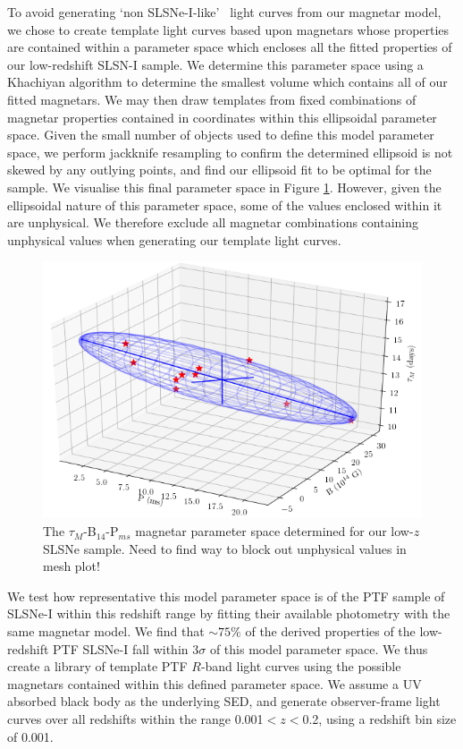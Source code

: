 \documentclass[a4paper,fleqn,usenatbib]{mnras}
\newcommand{\angus}[1]{\color{JungleGreen}#1\color{black}}
\begin{document}
To avoid generating \lq non SLSNe-I-like\rq~ light curves from our magnetar model, we chose to create template light curves based upon magnetars whose properties are contained within a parameter space which encloses all the fitted properties of our low-redshift SLSN-I sample. We determine this parameter space using a Khachiyan algorithm \citep{Aspvall1980,Khachiyan1980} to determine the smallest volume which contains all of our fitted magnetars. We may then draw templates from fixed combinations of magnetar properties contained in coordinates within this ellipsoidal parameter space. Given the small number of objects used to define this model parameter space, we perform jackknife resampling to confirm the determined ellipsoid is not skewed by any outlying points, and find our ellipsoid fit to be optimal for the sample. We visualise this final parameter space in Figure \ref{fig:param_space}. However, given the ellipsoidal nature of this parameter space, some of the values enclosed within it are unphysical. We therefore exclude all magnetar combinations containing unphysical values when generating our template light curves. 

\begin{figure}
	\includegraphics[width=\columnwidth]{./Original_3D_param_space.png}
    \caption{The $\tau_{M}$-B$_{14}$-P$_{ms}$ magnetar parameter space determined for our low-$z$ SLSNe sample. \angus{Need to find way to block out unphysical values in mesh plot!}}
    \label{fig:param_space}
\end{figure}

We test how representative this model parameter space is of the PTF sample of SLSNe-I within this redshift range by fitting their available photometry with the same magnetar model. We find that $\sim 75\%$ of the derived properties of the low-redshift PTF SLSNe-I fall within 3$\sigma$ of this model parameter space. We thus create a library of template PTF $R$-band light curves using the possible magnetars contained within this defined parameter space. We assume a UV absorbed black body as the underlying SED, and generate observer-frame light curves over all redshifts within the range 0.001$< z <$0.2, using a redshift bin size of 0.001.
\end{document}
